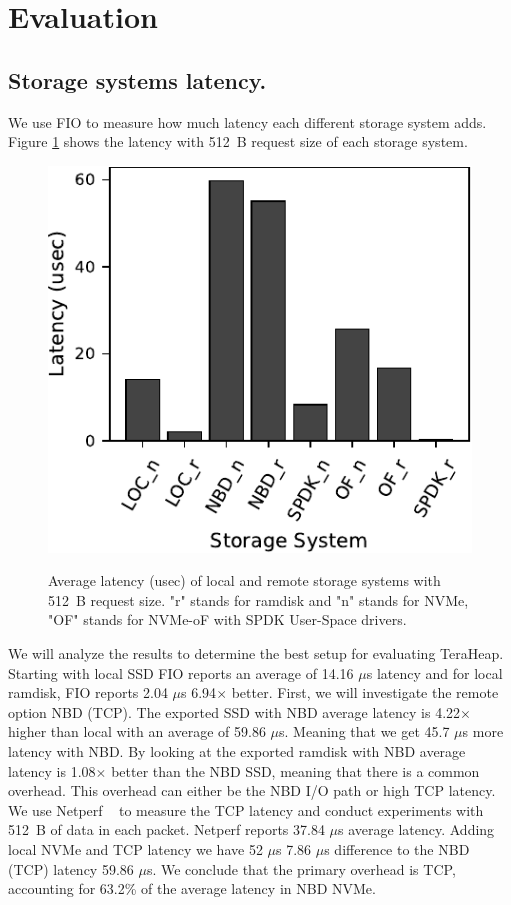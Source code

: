 \section{Evaluation}
\subsection{Storage systems latency.}
We use FIO to measure how much latency each different storage system adds.
Figure \ref{fig:fio_512} shows the latency with \SI{512}{B} request size
of each storage system.

\begin{figure}[H]
  \includegraphics[width=\linewidth]{figures/fio_512.pdf}\\
\caption{Average latency (usec) of local and remote storage systems with \SI{512}{B} request size. "r" stands for ramdisk and "n" stands for NVMe, "OF" stands for NVMe-oF with SPDK User-Space drivers.}
\label{fig:fio_512}
\end{figure}

We will analyze the results to determine the best setup for evaluating TeraHeap. Starting with local SSD FIO reports an average of 14.16 $\mu$s latency and for local ramdisk, FIO reports 2.04 $\mu$s 6.94$\times$ better. First, we will investigate the remote option NBD (TCP). The exported SSD with NBD average latency is 4.22$\times$ higher than local with an average of 59.86 $\mu$s. Meaning that we get 45.7 $\mu$s more latency with NBD. By looking at the exported ramdisk with NBD average latency is 1.08$\times$ better than the NBD SSD, meaning that there is a common overhead. This overhead can either be the NBD I/O path or high TCP latency. We use Netperf ~\cite{netperf} to measure the TCP latency and conduct experiments with \SI{512}{B} of data in each packet. Netperf reports 37.84 $\mu$s average
latency. Adding local NVMe and TCP latency we have 52 $\mu$s 7.86 $\mu$s difference to the NBD
(TCP) latency 59.86 $\mu$s. We conclude that the primary overhead is TCP, accounting for 63.2\% of the average latency in NBD NVMe.

